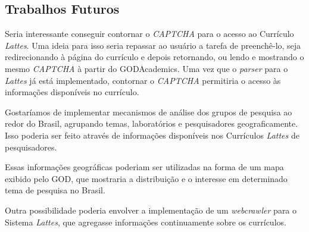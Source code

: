 \documentclass[12pt]{article}
\begin{document}
\subsection{Trabalhos Futuros}

Seria interessante conseguir contornar o \emph{CAPTCHA} para o acesso ao
Currículo \emph{Lattes}. Uma ideia para isso seria repassar ao usuário a
tarefa de preenchê-lo, seja redirecionando à página do currículo e depois
retornando, ou lendo e mostrando o mesmo \emph{CAPTCHA} à partir do
GODAcademics. Uma vez que o \emph{parser} para o \emph{Lattes} já está
implementado, contornar o \emph{CAPTCHA} permitiria o acesso às informações
disponíveis no currículo.

Gostaríamos de implementar mecanismos de análise dos grupos de pesquisa
ao redor do Brasil, agrupando temas, laboratórios e pesquisadores 
geograficamente. Isso poderia ser feito através de informações disponíveis
nos Currículos \emph{Lattes} de pesquisadores.

Essas informações geográficas poderiam ser utilizadas na forma de um mapa
exibido pelo GOD, que mostraria a distribuição e o interesse em determinado
tema de pesquisa no Brasil.

Outra possibilidade poderia envolver a implementação de um \emph{webcrawler}
para o Sistema \emph{Lattes}, que agregasse informações continuamente sobre
os currículos.
\end{document}
